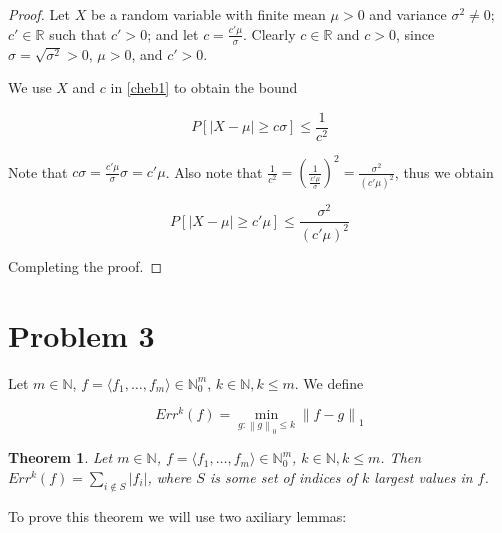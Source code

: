 \documentclass[11pt]{amsart}
\newtheorem{theorem}{Theorem}[section]
\newenvironment{definition}[1][Definition]{\begin{trivlist}
\item[\hskip \labelsep {\bfseries #1}]}{\end{trivlist}}
\newcommand{\norm}[1]{\left\lVert #1 \right\rVert}
\begin{document}
\begin{proof}
Let $X$ be a random variable with finite mean $\mu > 0$ and variance $\sigma^2 \ne 0$;
$c' \in \mathbb{R}$ such that $c' > 0$; and let $c = \frac{c' \mu}{\sigma}$. Clearly $c \in \mathbb{R}$ and $c > 0$, since $\sigma = \sqrt{\sigma^2} > 0$, $\mu > 0$, and $c' > 0$.

We use $X$ and $c$ in \ref{cheb1} to obtain the bound

$$
P\left[|X - \mu| \ge c \sigma\right] \le \frac{1}{c^2}
$$

Note that $c \sigma = \frac{c' \mu}{\sigma} \sigma = c' \mu$. Also note that $\frac{1}{c^2} = \left(\frac{1}{\frac{c' \mu}{\sigma}}\right)^2 = \frac{\sigma^2}{(c' \mu)^2}$, thus we obtain

$$
P\left[|X - \mu| \ge c' \mu\right] \le \frac{\sigma^2}{(c' \mu)^2}
$$

Completing the proof.
\end{proof}



\bigskip
\section*{Problem 3}
\addtocounter{section}{1}
\setcounter{theorem}{0}

\begin{definition}
Let $m \in \mathbb{N}$, $f = \langle f_1, \dots, f_m \rangle \in \mathbb{N}_0^m$, $k \in \mathbb{N}, k \le m$. We define

$$
Err^k(f) = \min_{g : \norm{g}_0 \le k}{\norm{f - g}_1}
$$
\end{definition}

\begin{theorem}
Let $m \in \mathbb{N}$, $f = \langle f_1, \dots, f_m \rangle \in \mathbb{N}_0^m$, $k \in \mathbb{N}, k \le m$. Then $Err^k(f) = \sum_{i \not\in S} |f_i|$, where $S$ is some set of indices of $k$ largest values in $f$.
\end{theorem}

To prove this theorem we will use two axiliary lemmas:
\end{document}
